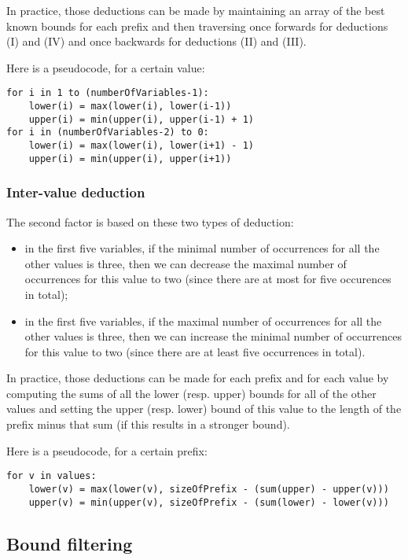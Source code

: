 \documentclass[a4paper,10pt]{article}
\begin{document}
In practice, those deductions can be made by maintaining an array of the best known bounds for each prefix and then traversing once forwards for deductions (I) and (IV) and once backwards for deductions (II) and (III).

Here is a pseudocode, for a certain value:
\begin{lstlisting}
for i in 1 to (numberOfVariables-1):
    lower(i) = max(lower(i), lower(i-1))
    upper(i) = min(upper(i), upper(i-1) + 1)
for i in (numberOfVariables-2) to 0:
    lower(i) = max(lower(i), lower(i+1) - 1)
    upper(i) = min(upper(i), upper(i+1))
\end{lstlisting}

\subsubsection{Inter-value deduction}

The second factor is based on these two types of deduction:
\begin{itemize}
    \item in the first five variables, if the minimal number of occurrences for all the other values is three, then we can decrease the maximal number of occurrences for this value to two (since there are at most for five occurences in total);
    \item in the first five variables, if the maximal number of occurrences for all the other values is three, then we can increase the minimal number of occurrences for this value to two (since there are at least five occurrences in total).
\end{itemize}

In practice, those deductions can be made for each prefix and for each value by computing the sums of all the lower (resp. upper) bounds for all of the other values and setting the upper (resp. lower) bound of this value to the length of the prefix minus that sum (if this results in a stronger bound).

Here is a pseudocode, for a certain prefix:
\begin{lstlisting}
for v in values:
    lower(v) = max(lower(v), sizeOfPrefix - (sum(upper) - upper(v)))
    upper(v) = min(upper(v), sizeOfPrefix - (sum(lower) - lower(v)))
\end{lstlisting}

\subsection{Bound filtering}
\label{subsec:filtering}
\end{document}
